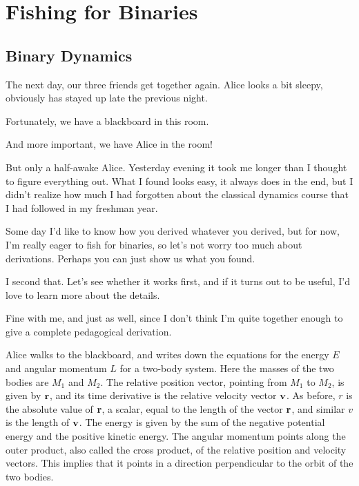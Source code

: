 \chapter{Fishing for Binaries}

\section{Binary Dynamics}

The next day, our three friends get together again.  Alice looks a bit
sleepy, obviously has stayed up late the previous night.

\abc

\carol
Fortunately, we have a blackboard in this room.

\bob
And more important, we have Alice in the room!

\alice
But only a half-awake Alice.  Yesterday evening it took me longer than
I thought to figure everything out.  What I found looks easy, it always
does in the end, but I didn't realize how much I had forgotten about
the classical dynamics course that I had followed in my freshman year.

\bob
Some day I'd like to know how you derived whatever you derived, but
for now, I'm really eager to fish for binaries, so let's not worry too
much about derivations.  Perhaps you can just show us what you found.

\carol
I second that.  Let's see whether it works first, and if it turns out
to be useful, I'd love to learn more about the details.

\alice
Fine with me, and just as well, since I don't think I'm quite together
enough to give a complete pedagogical derivation.

\cba

Alice walks to the blackboard, and writes down the equations for the
energy $E$ and angular momentum $L$ for a two-body system.  Here the
masses of the two bodies are $M_1$ and $M_2$.  The relative position
vector, pointing from $M_1$ to $M_2$, is given by ${\bf r}$, and its time
derivative is the relative velocity vector ${\bf v}$.  As before, $r$ is
the absolute value of ${\bf r}$, a scalar, equal to the length of the
vector ${\bf r}$, and similar $v$ is the length of ${\bf v}$.  The energy is
given by the sum of the negative potential energy and the positive
kinetic energy.  The angular momentum points along the outer product,
also called the cross product, of the relative position and velocity
vectors.  This implies that it points in a direction perpendicular to
the orbit of the two bodies.

